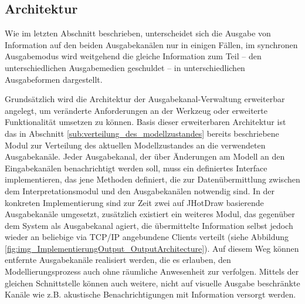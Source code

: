 \subsection{Architektur} %
\label{sub:architekur}

Wie im letzten Abschnitt beschrieben, unterscheidet sich die Ausgabe von Information auf den beiden Ausgabekanälen nur in einigen Fällen, im synchronen Ausgabemodus wird weitgehend die gleiche Information zum Teil -- den unterschiedlichen Ausgabemedien geschuldet -- in unterschiedlichen Ausgabeformen dargestellt.  

Grundsätzlich wird die Architektur der Ausgabekanal-Verwaltung erweiterbar angelegt, um veränderte Anforderungen an der Werkzeug oder erweiterte Funktionalität umsetzen zu können. Basis dieser erweiterbaren Architektur ist das in Abschnitt \ref{sub:verteilung_des_modellzustandes} bereits beschriebene Modul zur Verteilung des aktuellen Modellzustandes an die verwendeten Ausgabekanäle. Jeder Ausgabekanal, der über Änderungen am Modell an den Eingabekanälen benachrichtigt werden soll, muss ein definiertes Interface implementieren, das jene Methoden definiert, die zur Datenübermittlung zwischen dem Interpretationsmodul und den Ausgabekanälen notwendig sind. In der konkreten Implementierung sind zur Zeit zwei auf JHotDraw basierende Ausgabekanäle umgesetzt, zusätzlich existiert ein weiteres Modul, das gegenüber dem System als Ausgabekanal agiert, die übermittelte Information selbst jedoch wieder an beliebige via \gls{TCP}/\gls{IP} angebundene Clients verteilt (siehe Abbildung \ref{fig:img_ImplementierungOutput_OutputArchitecture}). Auf diesem Weg können entfernte Ausgabekanäle realisiert werden, die es erlauben, den Modellierungsprozess auch ohne räumliche Anwesenheit zur verfolgen. Mittels der gleichen Schnittstelle können auch weitere, nicht auf visuelle Ausgabe beschränkte Kanäle wie z.B. akustische Benachrichtigungen mit Information versorgt werden. 

